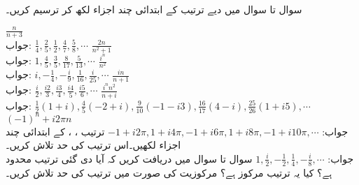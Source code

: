 سوال  تا سوال  میں دیے ترتیب کے ابتدائی چند اجزاء لکھ کر ترسیم کریں۔

\quad
$\tfrac{n}{n+3}$\\
جواب:\quad
$\tfrac{1}{4},\tfrac{2}{5},\tfrac{1}{2},\tfrac{4}{7},\tfrac{5}{8},\cdots$
\quad
$\tfrac{2n}{n^2+1}$\\
جواب:\quad
$1,\tfrac{4}{5},\tfrac{3}{5},\tfrac{8}{17},\tfrac{5}{13},\cdots$
\quad
$\tfrac{i^n}{n^2}$\\
جواب:\quad
$i,-\tfrac{1}{4},-\tfrac{i}{9},\tfrac{1}{16},\tfrac{i}{25},\cdots$
\quad
$\tfrac{in}{n+1}$\\
جواب:\quad
$\tfrac{i}{2},\tfrac{i2}{3},\tfrac{i3}{4},\tfrac{i4}{5},\tfrac{i5}{6},\cdots$
\quad
$\tfrac{i^n n^2}{n+i}$\\
جواب:\quad
$\tfrac{1}{2}(1+i),\tfrac{4}{5}(-2+i),\tfrac{9}{10}(-1-i3),\tfrac{16}{17}(4-i),\tfrac{25}{26}(1+i5),\cdots$
\quad
$(-1)^n+i2\pi n$\\
جواب:\quad
$-1+i2\pi, 1+i4\pi,-1+i6\pi, 1+i8\pi, -1+i10\pi,\cdots$
\quad
ترتیب ، ،  کے ابتدائی چند اجزاء لکھیں۔اس ترتیب  کی حد تلاش کریں۔\\
جواب:\quad
$1,\tfrac{i}{2}, -\tfrac{1}{2},\tfrac{1}{4}, -\tfrac{i}{8},\cdots$
سوال  تا سوال  میں دریافت کریں کہ آیا دی گئی ترتیب محدود ہے؟ کیا یہ ترتیب مرکوز ہے؟ مرکوزیت کی صورت میں ترتیب کی حد تلاش کریں۔
  
